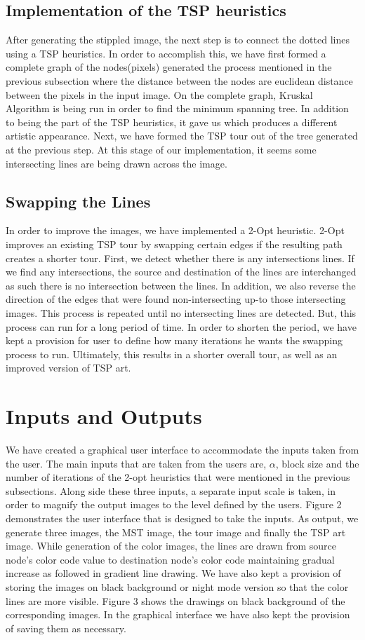 \documentclass[a4paper,12pt]{article}
\begin{document}
\subsection{Implementation of the TSP heuristics}
After generating the stippled image, the next step is to connect the dotted lines using a TSP heuristics. In order to accomplish this, we have first formed a complete graph of the nodes(pixels) generated the process mentioned in the previous subsection where the distance between the nodes are euclidean distance between the pixels in the input image. On the complete graph, Kruskal Algorithm is being run in order to find the minimum spanning tree. In addition to being the part of the TSP heuristics, it gave us which produces a different artistic appearance. Next, we have formed the TSP tour out of the tree generated at the previous step. At this stage of our implementation, it seems  some intersecting lines are being drawn across the image.

\subsection{Swapping the Lines}
In order to improve the images, we have implemented a 2-Opt heuristic. 2-Opt improves an existing TSP tour by swapping certain edges if the resulting path creates a shorter tour. First, we detect whether there is any intersections  lines. If we find any intersections, the source and destination of the lines are interchanged as such there is no intersection between the lines. In addition, we also reverse the direction of the edges that were found non-intersecting up-to those intersecting images. This process is repeated until no intersecting lines are detected. But, this process can run for a long period of time. In order to shorten the period, we have kept a provision for user to define how many iterations he wants the swapping process to run. Ultimately,  this results in a shorter overall tour, as well as an improved version of TSP art.

\medskip
\section{Inputs and Outputs}
We have created a graphical user interface to accommodate the inputs taken from the user. The  main inputs that are taken from the users are, $\alpha$, block size and the number of iterations of the 2-opt heuristics that were mentioned in the previous subsections. Along side these three inputs, a separate input scale is taken, in order to magnify the output images to the level defined by the users. Figure 2 demonstrates the user interface that is designed to take the inputs. As output, we generate three images, the MST image, the tour image and finally the TSP art image. While generation of the color images, the lines are drawn from source node's color code value to destination node's color code maintaining gradual increase as followed in gradient line drawing. We have also kept a provision of storing the images on black background or night mode version so that the color lines are more visible. Figure 3 shows the drawings on black background of the corresponding images. In the graphical interface we have also kept the provision of saving them as necessary.
\end{document}
